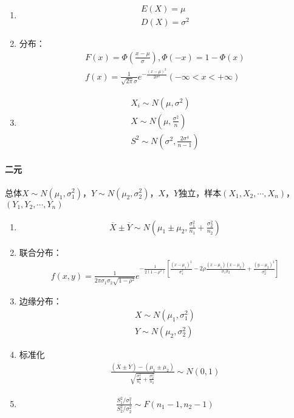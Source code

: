 \documentclass[12pt]{book}
\begin{document}
\begin{enumerate}[1.]
    \item \begin{gather*}
        E(X)=\mu \\
        D(X)=\sigma^2 
    \end{gather*}
    \item 分布：
    \begin{gather*}
        F\left(x\right)=\Phi\left(\frac{x-\mu}{\sigma}\right), \Phi\left(-x\right)=1-\Phi\left(x\right)\\
        f\left(x\right)=\frac{1}{\sqrt{2\pi}\sigma}e^{-\frac{\left(x-\mu\right)^2}{2\sigma^2}}(-\infty<x<+\infty)
    \end{gather*}
    \item \begin{gather*}
        X_i\sim N(\mu,\sigma^2) \\
        X\sim N(\mu,\frac{\sigma^2}{n}) \\
        S^2\sim N(\sigma^2,\frac{2\sigma^4}{n-1}) 
    \end{gather*}
\end{enumerate}


\paragraph{二元}

总体$X\sim N(\mu_1,\sigma_1^2)$，$Y\sim N(\mu_2,\sigma_2^2)$，$X$，$Y$独立，样本$(X_1,X_2,\cdots,X_n)$，$(Y_1,Y_2,\cdots,Y_n)$


\begin{enumerate}[1.]
    \item \begin{gather*}
        \overline{X}\pm\overline{Y}\sim N\left(\mu_1\pm \mu_2,\frac{\sigma_1^2}{n_1}+\frac{\sigma_2^2}{n_2}\right)
    \end{gather*}
    \item 联合分布：
    \begin{gather*}
        f(x,y) = \frac{1}{2\pi \sigma_1 \sigma_2\sqrt{1-\rho^2}} e^{
            -\frac{1}{2(1-\rho^2)}
            \left[\frac{(x-\mu_1)^2}{\sigma_1^2} - 2\rho \frac{(x-\mu_1)(x-\mu_2)}{\sigma_1 \sigma_2}+\frac{(y-\mu_2)^2}{\sigma_2^2} \right]
        }
    \end{gather*}
    \item 边缘分布：
    \begin{gather*}
        X\sim N(\mu_1,\sigma_1^2)\\
        Y\sim N(\mu_2,\sigma_2^2)
    \end{gather*}
    \item 标准化
    \begin{gather*}
        \frac{(\overline{X}\pm \overline{Y})-(\mu_1 \pm \mu_2)}{\sqrt{
            \frac{\sigma_1^2}{n_1}+\frac{\sigma_2^2}{n_2}
            }}\sim N(0,1)
    \end{gather*}
    \item \begin{gather*}
        \frac{S_1^2/\sigma_1^2}{S_2^2/\sigma_2^2}\sim F(n_1-1,n_2-1)
    \end{gather*}
\end{enumerate}
\end{document}
